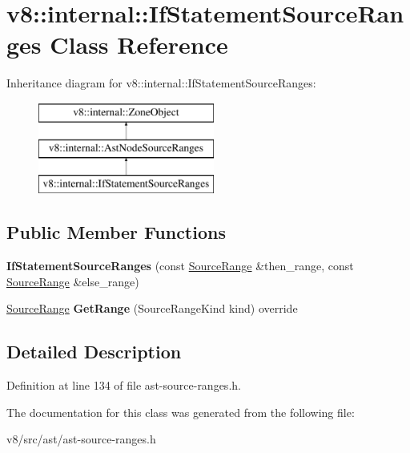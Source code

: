 \hypertarget{classv8_1_1internal_1_1IfStatementSourceRanges}{}\section{v8\+:\+:internal\+:\+:If\+Statement\+Source\+Ranges Class Reference}
\label{classv8_1_1internal_1_1IfStatementSourceRanges}
Inheritance diagram for v8\+:\+:internal\+:\+:If\+Statement\+Source\+Ranges\+:\begin{figure}[H]
\begin{center}
\leavevmode
\includegraphics[height=3.000000cm]{classv8_1_1internal_1_1IfStatementSourceRanges}
\end{center}
\end{figure}
\subsection*{Public Member Functions}
\begin{DoxyCompactItemize}
\item 
\mbox{\label{classv8_1_1internal_1_1IfStatementSourceRanges_a613f8248801c61a0e094662730d4fa8c}} 
{\bfseries If\+Statement\+Source\+Ranges} (const \mbox{\hyperlink{structv8_1_1internal_1_1SourceRange}{Source\+Range}} \&then\+\_\+range, const \mbox{\hyperlink{structv8_1_1internal_1_1SourceRange}{Source\+Range}} \&else\+\_\+range)
\item 
\mbox{\label{classv8_1_1internal_1_1IfStatementSourceRanges_a64c851201d17fc0f852e51611c15c537}} 
\mbox{\hyperlink{structv8_1_1internal_1_1SourceRange}{Source\+Range}} {\bfseries Get\+Range} (Source\+Range\+Kind kind) override
\end{DoxyCompactItemize}


\subsection{Detailed Description}


Definition at line 134 of file ast-\/source-\/ranges.\+h.



The documentation for this class was generated from the following file\+:\begin{DoxyCompactItemize}
\item 
v8/src/ast/ast-\/source-\/ranges.\+h\end{DoxyCompactItemize}
